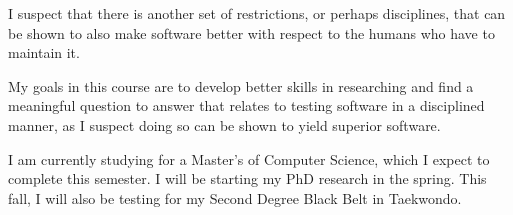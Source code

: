 I suspect that there is another set of restrictions, or perhaps disciplines, that can be shown to also make software better with respect to the humans who have to maintain it.

My goals in this course are to develop better skills in researching and find a meaningful question to answer that relates to testing software in a disciplined manner, as I suspect doing so can be shown to yield superior software.

I am currently studying for a Master's of Computer Science, which I expect to complete this semester.
I will be starting my PhD research in the spring.
This fall, I will also be testing for my Second Degree Black Belt in Taekwondo.
